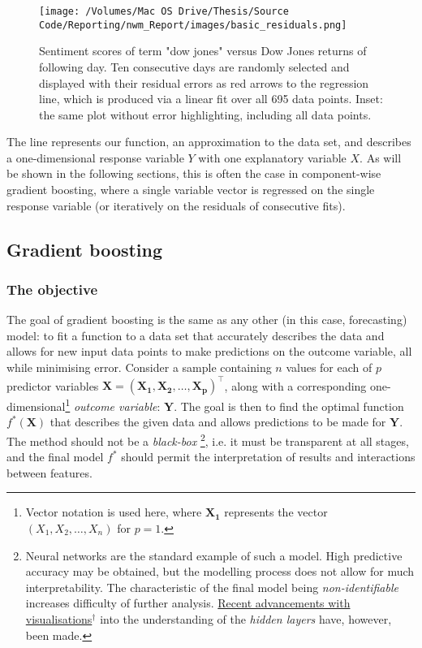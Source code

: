 \documentclass{article}
\begin{document}
\begin{figure}[htb]
\centering
\texttt{[image: /Volumes/Mac OS Drive/Thesis/Source Code/Reporting/nwm\_Report/images/basic\_residuals.png]}
\caption[An example of linear regression using sentiment analysis scores]{\label{fig:basic.residuals}Sentiment scores of term "dow jones" versus Dow Jones returns of following day. Ten consecutive days are randomly selected and displayed with their residual errors as red arrows to the regression line, which is produced via a linear fit over all 695 data points. Inset: the same plot without error highlighting, including all data points.}
\end{figure}

The line represents our function, an approximation to the data set, and describes a one-dimensional response variable $Y$ with one explanatory variable $X$. As will be shown in the following sections, this is often the case in component-wise gradient boosting, where a single variable vector is regressed on the single response variable (or iteratively on the residuals of consecutive fits).


\subsection{Gradient boosting \label{grad-boosting}}
\label{sec-1-3}


\subsubsection{The objective \label{basic-problem}}
\label{sec-1-3-1}

The goal of gradient boosting is the same as any other (in this case, forecasting) model: to fit a function to a data set that accurately describes the data and allows for new input data points to make predictions on the outcome variable, all while minimising error. Consider a sample containing $n$ values for each of $p$ predictor variables $\mathbf{X = (X_1, X_2, … , X_p)^\top}$, along with a corresponding one-dimensional\footnote{Vector notation is used here, where $\mathbf{X_1}$ represents the vector $(X_1, X_2, … , X_n)$ for $p = 1$.} \emph{outcome variable}: $\mathbf{Y}$. The goal is then to find the optimal function $f^* (\mathbf{X})$ that describes the given data and allows predictions to be made for $\mathbf{Y}$. The method should not be a \emph{black-box} \footnote{Neural networks are the standard example of such a model. High predictive accuracy may be obtained, but the modelling process does not allow for much interpretability. The characteristic of the final model being \emph{non-identifiable} increases difficulty of further analysis. \href{http://colah.github.io/posts/2014-03-NN-Manifolds-Topology/}{Recent advancements with visualisations$^{\dag{}}$} into the understanding of the \emph{hidden layers} have, however, been made.}, i.e. it must be transparent at all stages, and the final model $f^*$ should permit the interpretation of results and interactions between features.
\end{document}
